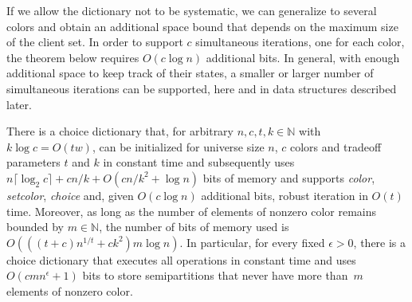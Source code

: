 \documentclass[envcountsame,envcountsect,undated,nolinenumbers]{lnthi}
\def\Tvn#1{\hbox{\textit{#1\/}}}
\def\Tceil#1{\lceil #1\rceil}
\def\TbbbN{\mathbb{N}}
\begin{document}
If we allow 
the dictionary not to be systematic,
we can generalize to several colors and
obtain an additional space bound that depends
on the maximum size of the client set.
In order to support $c$ simultaneous iterations,
one for each color, the theorem below requires
$O(c\log n)$ additional bits.
In general, with enough additional space to keep
track of their states, a smaller or larger number
of simultaneous iterations can be supported,
here and in data structures described later.

\begin{theorem}
\label{thm:m-c}There is a choice dictionary
that, for arbitrary $n,c,t,k\in\TbbbN$
with $k\log c=O(t w)$,
can be initialized
for universe size $n$, $c$ colors
and tradeoff parameters $t$ and $k$
in constant time and subsequently uses
$n\Tceil{\log_2 c}+{{c n}/k}+O({{c n}/{k^2}}+\log n)$
bits of memory
and supports \Tvn{color}, \Tvn{setcolor},
\Tvn{choice} and,
given $O(c\log n)$ additional bits, robust
iteration in $O(t)$ time.
Moreover, as long as the number of elements
of nonzero color
remains bounded by $m\in\TbbbN$,
the number of bits of memory used is
$O(((t+c)n^{1/t}+c k^2)m\log n)$.
In particular, for every fixed $\epsilon>0$, there is
a choice dictionary that executes all
operations in constant time and uses
$O(c m n^\epsilon+1)$ bits to store
semipartitions that never have more than~$m$
elements of nonzero color.
\end{theorem}
\end{document}
